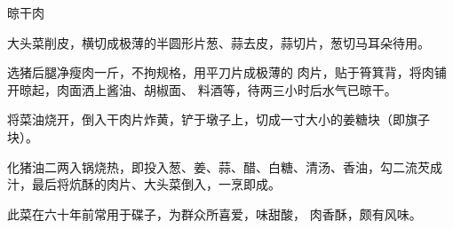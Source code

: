 \begin{recipe}{晾干肉}

\ingredients



\cooking

\step 大头菜削皮，横切成极薄的半圆形片葱、蒜去皮，蒜切片，葱切马耳朵待用。

选猪后腿净瘦肉一斤，不拘规格，用平刀片成极薄的 肉片，贴于筲箕背，将肉铺开晾起，肉面洒上酱油、胡椒面、 料酒等，待两三小时后水气已晾干。

\step 将菜油烧开，倒入干肉片炸黄，铲于墩子上，切成一寸大小的姜糖块（即旗子块）。

\step 化猪油二两入锅烧热，即投入葱、姜、蒜、醋、白糖、清汤、香油，勾二流芡成汁，最后将炕酥的肉片、大头菜倒入，一烹即成。

\notes

此菜在六十年前常用于碟子，为群众所喜爱，味甜酸， 肉香酥，颇有风味。

\end{recipe}

